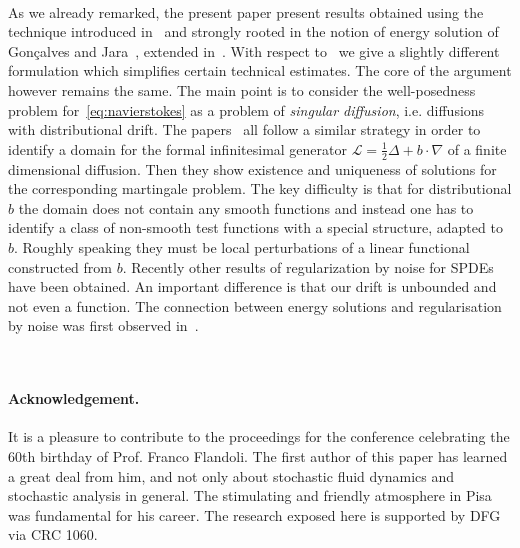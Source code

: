 \documentclass{article}
\newcommand{\tmem}[1]{{\em #1\/}}
\begin{document}
\

As we already remarked, the present paper present results obtained using the
technique introduced in~{\cite{gubinelli2018infinitesimal}} and strongly
rooted in the notion of energy solution of Gon{\c c}alves and
Jara~{\cite{Goncalves2014}}, extended in~{\cite{gubinelli2013regularization}}.
With respect to~{\cite{gubinelli2018infinitesimal}} we give a slightly
different formulation which simplifies certain technical estimates. The core
of the argument however remains the same. The main point is to consider the
well-posedness problem for~{\eqref{eq:navierstokes}} as a problem of
{\tmem{singular diffusion}}, i.e. diffusions with distributional drift. The
papers~{\cite{Flandoli2003,Flandoli2004,Delarue2016,Cannizzaro2018}} all
follow a similar strategy in order to identify a domain for the formal
infinitesimal generator $\mathcal{L}= \tfrac{1}{2} \Delta + b \cdot \nabla$ of
a finite dimensional diffusion. Then they show existence and uniqueness of
solutions for the corresponding martingale problem. The key difficulty is that
for distributional $b$ the domain does not contain any smooth functions and
instead one has to identify a class of non-smooth test functions with a
special structure, adapted to $b$. Roughly speaking they must be local
perturbations of a linear functional constructed from $b$. Recently other
results of regularization by noise for SPDEs~{\cite{DaPrato2013,DaPrato2016}}
have been obtained. An important difference is that our drift is unbounded and
not even a function. The connection between energy solutions and
regularisation by noise was first observed
in~{\cite{gubinelli2013regularization}}.

\

\paragraph{Acknowledgement.}It is a pleasure to contribute to the proceedings
for the conference celebrating the 60th birthday of Prof. Franco Flandoli. The
first author of this paper has learned a great deal from him, and not only
about stochastic fluid dynamics and stochastic analysis in general. The
stimulating and friendly atmosphere in Pisa was fundamental for his career.
The research exposed here is supported by DFG via CRC 1060.

\
\end{document}
